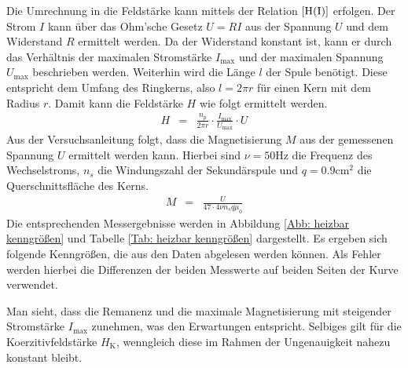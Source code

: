 \documentclass[12pt,a4paper]{scrartcl}
\numberwithin{equation}{section} %
\newcommand{\pu}[1]{\ensuremath{\mathrm{#1}}}
\renewcommand{\[}{} %
\renewcommand{\]}{\noindent} %
\begin{document}
Die Umrechnung in die Feldstärke kann mittels der Relation \(\eqref{H(I)}\) erfolgen. Der Strom \(I\) kann über das Ohm'sche Gesetz \(U=RI\) aus der Spannung \(U\) und dem Widerstand \(R\) ermittelt werden. Da der Widerstand konstant ist, kann er durch das Verhältnis der maximalen Stromstärke \(I_\mathrm{max}\) und der maximalen Spannung \(U_\mathrm{max}\) beschrieben werden. Weiterhin wird die Länge \(l\) der Spule benötigt. Diese entspricht dem Umfang des Ringkerns, also \(l=2\pi r\) für einen Kern mit dem Radius \(r\). Damit kann die
Feldstärke \(H\) wie folgt ermittelt werden.
\begin{eqnarray}
    H &=&
        \frac{n_p}{2\pi r} \cdot \frac{I_\mathrm{max}}{U_\mathrm{max}} \cdot U
        \label{H}
\end{eqnarray}
Aus der Versuchsanleitung \cite{Uni} folgt, dass die Magnetisierung \(M\) aus der gemessenen Spannung \(U\) ermittelt werden kann. Hierbei sind \(\nu=\pu{50 Hz}\) die Frequenz des Wechselstroms, \(n_s\) die Windungszahl der Sekundärspule und \(q = \pu{0.9 cm^2}\) die
Querschnittsfläche des Kerns.
\begin{eqnarray}
    M &=&
        \frac{U}{47\cdot 4\nu n_s q \mu_0}
        \label{M}
\end{eqnarray}
Die entsprechenden Messergebnisse werden in Abbildung \ref{Abb: heizbar kenngrößen} und Tabelle \ref{Tab: heizbar kenngrößen} dargestellt. Es ergeben sich folgende Kenngrößen, die aus den Daten abgelesen werden können. Als Fehler werden hierbei die Differenzen der beiden Messwerte auf beiden Seiten der Kurve verwendet.

Man sieht, dass die Remanenz und die maximale Magnetisierung mit
steigender Stromstärke \(I_\mathrm{max}\) zunehmen, was den Erwartungen
entspricht. Selbiges gilt für die Koerzitivfeldstärke \(H_\mathrm{K}\),
wenngleich diese im Rahmen der Ungenauigkeit nahezu konstant bleibt.
\end{document}
